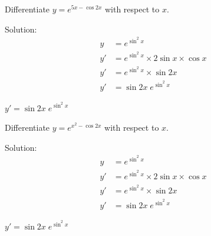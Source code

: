 \begin{mtask}
   \task \begin{exercise} Differentiate $y=e^{5x-\cos{2x}}$ with respect to $x$.
             \begin{envSolution}
			      Solution:
			      \begin{align*}
			           y & =e^{\sin ^{2} x}                               \\[15pt]
                       y' & =e^{\sin ^{2} x} \times 2\sin x \times \cos x \\[10pt]
   					   y' & =e^{\sin ^{2} x} \times \sin 2x               \\[10pt]
   					   y' & =\sin 2x \; e^{\sin ^{2} x}                  
				 \end{align*}
                 \begin{shortsolution}  
				       $y' =\sin 2x \; e^{\sin ^{2} x}$
			     \end{shortsolution}				 
               \end{envSolution}
         \end{exercise}


   \task \begin{exercise} Differentiate $y=e^{x^2-\cos{2x}}$ with respect to $x$.
             \begin{envSolution}
			      Solution:
			      \begin{align*}
			           y & =e^{\sin ^{2} x}                               \\[15pt]
                       y' & =e^{\sin ^{2} x} \times 2\sin x \times \cos x \\[10pt]
   					   y' & =e^{\sin ^{2} x} \times \sin 2x               \\[10pt]
   					   y' & =\sin 2x \; e^{\sin ^{2} x}                  
				 \end{align*}
                 \begin{shortsolution}  
				       $y' =\sin 2x \; e^{\sin ^{2} x}$
			     \end{shortsolution}				 
               \end{envSolution}
         \end{exercise}

\end{mtask}



